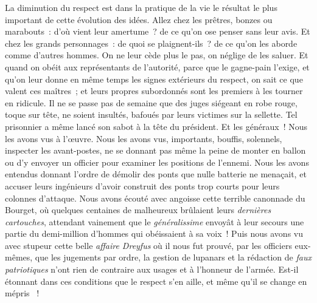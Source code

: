 \documentclass[french,twoside]{book} %
\begin{document}
La diminution du respect est dans la pratique de la vie le résultat le plus important de cette évolution des idées. Allez chez les prêtres, bonzes ou marabouts :  d’où vient leur amertume ? de ce qu’on ose penser sans leur avis. Et chez les grands personnages : de quoi se plaignent-ils ? de ce qu’on les aborde comme d’autres hommes. On ne leur cède plus le pas, on néglige de les saluer. Et quand on obéit aux représentants de l’autorité, parce que le gagne-pain l’exige, et qu’on leur donne en même temps les signes extérieurs du respect, on sait ce que valent ces maîtres ; et leurs propres subordonnés sont les premiers à les tourner en ridicule. Il ne se passe pas de semaine que des juges siégeant en robe rouge, toque sur tête, ne soient insultés, bafoués par leurs victimes sur la sellette. Tel prisonnier a même lancé son sabot à la tête du président. Et les généraux ! Nous les avons vus à l’œuvre. Nous les avons vus, importants,  bouffis, solennels, inspecter les avant-postes, ne se donnant pas même la peine de monter en ballon ou d’y envoyer un officier pour examiner les positions de l’ennemi. Nous les avons entendus donnant l’ordre de démolir des ponts que nulle batterie ne menaçait, et accuser leurs ingénieurs d’avoir construit des ponts trop courts pour leurs colonnes d’attaque. Nous avons écouté avec angoisse cette terrible canonnade du Bourget, où quelques centaines de malheureux brûlaient leurs \emph{dernières cartouches}, attendant vainement que le \emph{généralissime} envoyât à leur secours une partie du demi-million d’hommes qui obéissaient à sa voix ! Puis nous avons vu avec stupeur cette belle \emph{affaire Dreyfus} où il nous fut prouvé, par les officiers eux-mêmes,  que les jugements par ordre, la gestion de lupanars et la rédaction de \emph{faux patriotiques} n’ont rien de contraire aux usages et à l’honneur de l’armée. Est-il étonnant dans ces conditions que le respect s’en aille, et même qu’il se change en mépris  !\par
\end{document}
